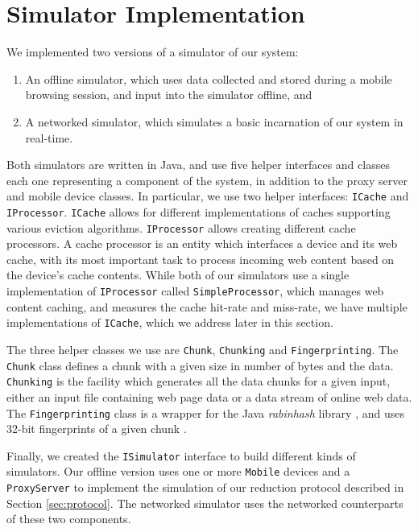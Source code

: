 \section{Simulator Implementation}
\label{sec:implementation}
We implemented two versions of a simulator of our system: 
\begin{enumerate}
\item An offline simulator, which uses data collected and stored during a mobile browsing session, and input into the simulator offline, and
\item A networked simulator, which simulates a basic incarnation of our system in real-time.
\end{enumerate}
Both simulators are written in Java, and use five helper interfaces and classes each one representing a component of the system, in addition to the proxy server and mobile device classes. In particular, we use two helper interfaces: \texttt{ICache} and \texttt{IProcessor}. \texttt{ICache} allows for different implementations of caches supporting various eviction algorithms. \texttt{IProcessor} allows creating different cache processors. A cache processor is an entity which interfaces a device and its web cache, with its most important task to process incoming web content based on the device's cache contents. While both of our simulators use a single implementation of \texttt{IProcessor} called \texttt{SimpleProcessor}, which manages web content caching, and measures the cache hit-rate and miss-rate, we have multiple implementations of \texttt{ICache}, which we address later in this section. 

The three helper classes we use are \texttt{Chunk}, \texttt{Chunking} and \texttt{Fingerprinting}. The \texttt{Chunk} class defines a chunk with a given size in number of bytes and the data. \texttt{Chunking} is the facility which generates all the data chunks for a given input, either an input file containing web page data or a data stream of online web data. The \texttt{Fingerprinting} class is a wrapper for the Java \emph{rabinhash} library \cite{rabinhash}, and uses 32-bit fingerprints of a given chunk \cite{rabin_api}.

Finally, we created the \texttt{ISimulator} interface to build different kinds of simulators. Our offline version uses one or more \texttt{Mobile} devices and a \texttt{ProxyServer} to implement the simulation of our reduction protocol described in Section \ref{sec:protocol}. The networked simulator uses the networked counterparts of these two components.


